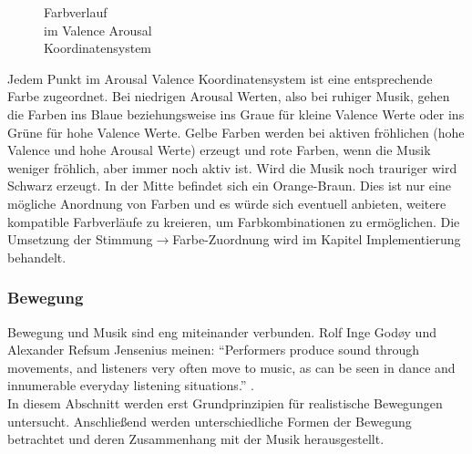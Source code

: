 \documentclass[11pt,a4paper]{article}
\begin{document}
\begin{wrapfigure}{l}{0.5\linewidth}
\captionsetup{justification=centering}
\caption[Farbverlauf im Valence Arousal Koordinatensystem]{Farbverlauf\\im Valence Arousal\\Koordinatensystem}
\label{fig:Farbverlauf}
\end{wrapfigure}
\noindent
Jedem Punkt im Arousal Valence Koordinatensystem ist eine entsprechende Farbe zugeordnet. Bei niedrigen Arousal Werten, also bei ruhiger Musik, gehen die Farben ins Blaue beziehungsweise ins Graue für kleine Valence Werte oder ins Grüne für hohe Valence Werte. Gelbe Farben werden bei aktiven fröhlichen (hohe Valence und hohe Arousal Werte) erzeugt und rote Farben, wenn die Musik weniger fröhlich, aber immer noch aktiv ist. Wird die Musik noch trauriger wird Schwarz erzeugt. In der Mitte befindet sich ein Orange-Braun. Dies ist nur eine mögliche Anordnung von Farben und es würde sich eventuell anbieten, weitere kompatible Farbverläufe zu kreieren, um Farbkombinationen zu ermöglichen. Die Umsetzung der Stimmung$ \rightarrow $Farbe-Zuordnung wird im Kapitel Implementierung behandelt.

\subsubsection*{Bewegung}
Bewegung und Musik sind eng miteinander verbunden. Rolf Inge God{\o}y und Alexander Refsum Jensenius meinen: ``Performers produce sound through movements, and listeners very often move to music, as can be seen in dance and innumerable everyday listening situations.'' \cite[S. 1]{905eee055abaf2a4f198ce11f35362a8963f61d552297a02dfc8fbc0c4f78679}.\\
In diesem Abschnitt werden erst Grundprinzipien für realistische Bewegungen untersucht. Anschließend werden unterschiedliche Formen der Bewegung betrachtet und deren Zusammenhang mit der Musik herausgestellt.
\end{document}
